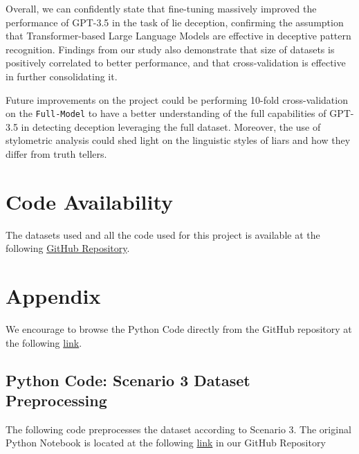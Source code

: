 \documentclass[10pt,twocolumn,letterpaper]{article}
\begin{document}
Overall, we can confidently state that fine-tuning massively improved the performance of GPT-3.5 in the task of lie deception,
confirming the assumption that Transformer-based Large Language Models are effective in deceptive pattern recognition. Findings
from our study also demonstrate that size of datasets is positively correlated to better performance, and that cross-validation
is effective in further consolidating it.

Future improvements on the project could be performing 10-fold cross-validation on the \texttt{Full-Model} to have a better understanding
of the full capabilities of GPT-3.5 in detecting deception leveraging the full dataset. Moreover, the use of stylometric analysis could shed
light on the linguistic styles of liars and how they differ from truth tellers.

\section{Code Availability}
The datasets used and all the code used for this project is available
at the following \href{https://github.com/TannerAGraves/GPT-LieDetection/}{GitHub Repository}.



{\small


}

\clearpage %
\onecolumn %

\section{Appendix}
\label{sec:appendix}

We encourage to browse the Python Code directly from the GitHub repository at the following \href{https://github.com/TannerAGraves/GPT-LieDetection/}{link}.

\subsection{Python Code: Scenario 3 Dataset Preprocessing}

The following code preprocesses the dataset according to Scenario 3.
The original Python Notebook is located at the following \href{https://colab.research.google.com/github/TannerAGraves/GPT-LieDetection/blob/main/dataset/datasets.ipynb}{link} in our GitHub Repository
\end{document}
